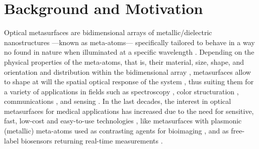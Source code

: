
\chapter*{Background and Motivation}
\label{chapter:intro}



Optical metasurfaces are bidimensional arrays of metallic/dielectric nanostructures ---known as meta-atoms--- specifically tailored to behave in a way no found in nature when illuminated at a specific wavelength \cite{khan_optical_2022,gonzalez-alcalde_large_2020}. Depending on the physical properties of the meta-atoms, that is, their material, size, shape, and orientation and distribution within the bidimensional array \cite{kim_plasmonic_2019,khan_optical_2022}, metasurfaces allow to shape at will the  spatial optical response of the system \cite{chen_review_2016}, thus suiting them for a variety of applications in fields such as spectroscopy \cite{khan_optical_2022}, color structuration \cite{gonzalez-alcalde_large_2020}, communications \cite{chen_review_2016}, and sensing \cite{estevez_trends_2014,jain_noble_2008,khan_optical_2022,chen_review_2016,kim_plasmonic_2019}. In the last decades, the interest in optical metasurfaces for medical applications has increased due to  the need for sensitive, fast, low-cost and easy-to-use technologies \cite{estevez_trends_2014,kim_plasmonic_2019}, like metasurfaces with plasmonic (metallic) meta-atoms used as contrasting agents for bioimaging  \cite{kim_plasmonic_2019}, and as free-label biosensors returning real-time measurements \cite{estevez_trends_2014,kabashin_plasmonic_2009,khan_optical_2022}.

